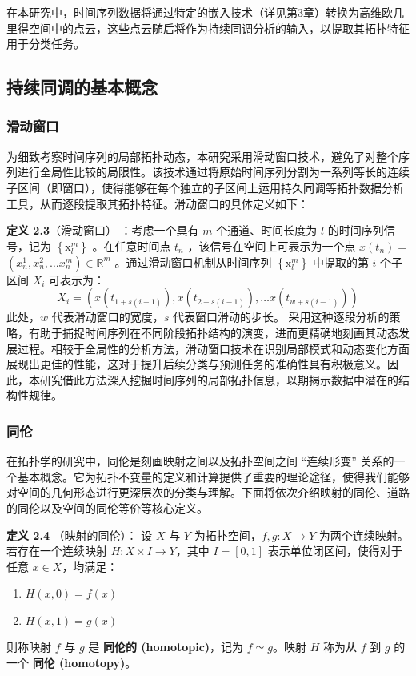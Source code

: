 在本研究中，时间序列数据将通过特定的嵌入技术（详见第3章）转换为高维欧几里得空间中的点云，这些点云随后将作为持续同调分析的输入，以提取其拓扑特征用于分类任务。

\subsection{持续同调的基本概念}
\subsubsection{滑动窗口}
为细致考察时间序列的局部拓扑动态，本研究采用滑动窗口技术，避免了对整个序列进行全局性比较的局限性。该技术通过将原始时间序列分割为一系列等长的连续子区间（即窗口），使得能够在每个独立的子区间上运用持久同调等拓扑数据分析工具，从而逐段提取其拓扑特征。滑动窗口的具体定义如下：

\textbf{定义 2.3}（滑动窗口）\cite{1021736289.nh} ：考虑一个具有 $m$ 个通道、时间长度为 $l$ 的时间序列信号，记为 $\left\{\mathrm{x}_l^m\right\}$ 。在任意时间点 $t_n$ ，该信号在空间上可表示为一个点 $x\left(t_n\right)=$ $\left(x_n^1, x_n^2, \ldots x_n^m\right) \in \mathbb{R}^m$ 。通过滑动窗口机制从时间序列 $\left\{\mathrm{x}_l^m\right\}$ 中提取的第 $i$ 个子区间 $X_i$ 可表示为：
$$
    X_i=\left(x\left(t_{1+s(i-1)}\right), x\left(t_{2+s(i-1)}\right), \ldots x\left(t_{w+s(i-1)}\right)\right)
$$
此处，$w$ 代表滑动窗口的宽度，$s$ 代表窗口滑动的步长。
采用这种逐段分析的策略，有助于捕捉时间序列在不同阶段拓扑结构的演变，进而更精确地刻画其动态发展过程。相较于全局性的分析方法，滑动窗口技术在识别局部模式和动态变化方面展现出更佳的性能，这对于提升后续分类与预测任务的准确性具有积极意义。因此，本研究借此方法深入挖掘时间序列的局部拓扑信息，以期揭示数据中潜在的结构性规律。

\subsubsection{同伦}
在拓扑学的研究中，同伦是刻画映射之间以及拓扑空间之间 ``连续形变'' 关系的一个基本概念。它为拓扑不变量的定义和计算提供了重要的理论途径，使得我们能够对空间的几何形态进行更深层次的分类与理解。下面将依次介绍映射的同伦、道路的同伦以及空间的同伦等价等核心定义。

\textbf{定义 2.4} （映射的同伦）\cite{armstrong2013basic}：
设 $X$ 与 $Y$ 为拓扑空间，$f, g: X \to Y$ 为两个连续映射。若存在一个连续映射 $H: X \times I \to Y$，其中 $I = [0, 1]$ 表示单位闭区间，使得对于任意 $x \in X$，均满足：
\begin{enumerate}
    \item $H(x, 0) = f(x)$
    \item $H(x, 1) = g(x)$
\end{enumerate}
则称映射 $f$ 与 $g$ 是 \textbf{同伦的 (homotopic)}，记为 $f \simeq g$。映射 $H$ 称为从 $f$ 到 $g$ 的一个 \textbf{同伦 (homotopy)}。

